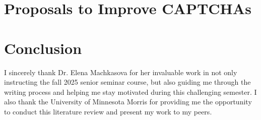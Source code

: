 \documentclass[sigplan,screen,nonacm]{acmart-tagged}
\begin{document}
\section{Proposals to Improve CAPTCHAs}

\section{Conclusion}



\begin{acks}
I sincerely thank Dr. Elena Machkasova for her invaluable work in not only instructing the fall 2025 senior seminar course, but also guiding me through the writing process and helping me stay motivated during this challenging semester. I also thank the University of Minnesota Morris for providing me the opportunity to conduct this literature review and present my work to my peers.
\end{acks}



\end{document}
